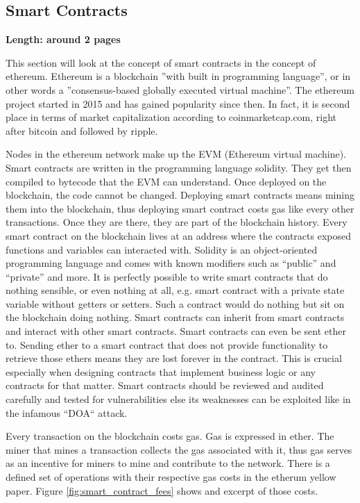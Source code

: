 \subsection{Smart Contracts}
\label{subsec:02_smart_contracts}

\textbf{Length: around 2 pages}

This section will look at the concept of smart contracts in the concept of ethereum.
Ethereum is a blockchain ''with built in programming language'', or in other words a ''consensus-based globally executed virtual machine''. 
The ethereum project started in 2015 and has gained popularity since then. In fact, it is second place in terms of market capitalization according to coinmarketcap.com, right after bitcoin and followed by ripple.

Nodes in the ethereum network make up the EVM (Ethereum virtual machine). Smart contracts are written in the programming language solidity. They get then compiled to bytecode that the EVM can understand.
Once deployed on the blockchain, the code cannot be changed. Deploying smart contracts means mining them into the blockchain, thus deploying smart contract costs gas like every other transactions. Once they are there, they are part of the blockchain history.
Every smart contract on the blockchain lives at an address where the contracts exposed functions and variables can interacted with. Solidity is an object-oriented programming language and comes with known modifiers such as ``public'' and ``private'' and more.
It is perfectly possible to write smart contracts that do nothing sensible, or even nothing at all, e.g. smart contract with a private state variable without getters or setters.
Such a contract would do nothing but sit on the blockchain doing nothing. Smart contracts can inherit from smart contracts and interact with other smart contracts. 
Smart contracts can even be sent ether to. Sending ether to a smart contract that does not provide functionality to retrieve those ethers means they are lost forever in the contract.
This is crucial especially when designing contracts that implement business logic or any contracts for that matter. Smart contracts should be reviewed and audited carefully and tested for vulnerabilities else its weaknesses can be exploited like in the infamous ``DOA`` attack.

Every transaction on the blockchain costs gas. Gas is expressed in ether. The miner that mines a transaction collects the gas associated with it, thus gas serves as an incentive for miners to mine and contribute to the network. There is a defined set of operations with their respective gas costs in the etherum yellow paper.
Figure \ref{fig:smart_contract_fees} shows and excerpt of those costs.


